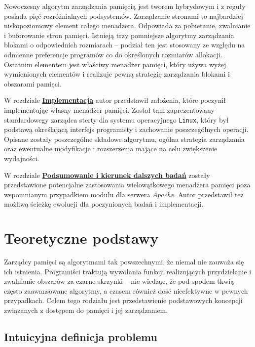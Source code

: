 \documentclass[12pt,a4paper,titlepage,twoside]{mwart}
\begin{document}
Nowoczesny algorytm zarządzania pamięcią jest tworem hybrydowym i z reguły
posiada pięć rozróżnialnych podsystemów. Zarządzanie stronami to najbardziej
niskopoziomowy element całego menadżera. Odpowiada za pobieranie, zwalnianie i
buforowanie stron pamięci. Istnieją trzy pomniejsze algorytmy zarządzania
blokami o odpowiednich rozmiarach -- podział ten jest stosowany ze względu na
odmienne preferencje programów co do określonych rozmiarów allokacji. Ostatnim
elementem jest właściwy menadżer pamięci, który używa wyżej wymienionych
elementów i realizuje pewną strategię zarządzania blokami i obszarami pamięci.

W rozdziale \hyperlink{Implementacja}{\textbf{Implementacja}} autor przedstawił
założenia, które poczynił implementując własny menadżer pamięci. Został tam
zaprezentowany standardowegy zarządca sterty dla systemu operacyjnego
\texttt{Linux}, który był podstawą określającą interfejs programisty i
zachowanie poszczególnych operacji. Opisane zostały poszczególne składowe
algorytmu, ogólna strategia zarządzania oraz ewentualne modyfikacje i
rozszerzenia mające na celu zwiększenie wydajności.

W rozdziale \hyperlink{Podsumowanie}{\textbf{Podsumowanie i kierunek dalszych
badań}} zostały przedstawione potencjalne zastosowania wielowątkowego menadżera
pamięci poza wspomnianym przypadkiem modułu dla serwera \textit{Apache}. Autor
przedstawił też możliwą ścieżkę ewolucji dla poczynionych badań i
implementacji.

\newpage


\section{Teoretyczne podstawy}
\hypertarget{Teoria}{}

Zarządcy pamięci są algorytmami tak powszechnymi, że niemal nie zauważa się ich
istnienia. Programiści traktują wywołania funkcji realizujących przydzielanie i
zwalnianie obszarów za czarne skrzynki -- nie wiedząc, że pod spodem tkwią
często zaawansowane algorytmy, a czasem również dość nieefektywne w pewnych
przypadkach. Celem tego rodziału jest przedstawienie podstawowych koncepcji
związanych z dostępem do pamięci i jej zarządzaniem.

\subsection{Intuicyjna definicja problemu}
\end{document}
